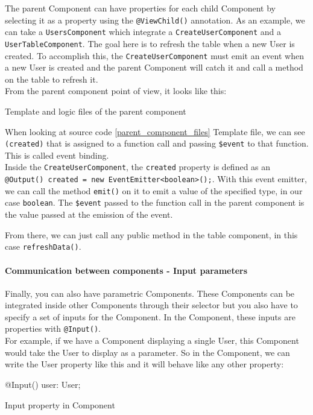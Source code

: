 \documentclass[twoside, openright,11pt,a4paper]{book}
\newenvironment{code}{\captionsetup{type=listing}}{}
\begin{document}
The parent Component can have properties for each child Component by selecting it as a property using the \verb+@ViewChild()+ annotation. As an example, we can take a \verb+UsersComponent+ which integrate a \verb+CreateUserComponent+ and a \verb+UserTableComponent+. The goal here is to refresh the table when a new User is created. To accomplish this, the \verb+CreateUserComponent+ must emit an event when a new User is created and the parent Component will catch it and call a method on the table to refresh it. \\

From the parent component point of view, it looks like this:
\begin{code}
	\caption{Template and logic files of the parent component}
	\label{parent_component_files}
\end{code}
When looking at source code \ref{parent_component_files} Template file, we can see \verb+(created)+ that is assigned to a function call and passing \verb+$event+ to that function. This is called event binding.\\

Inside the \verb+CreateUserComponent+, the \verb+created+ property is defined as an \texttt{@Output() created = new EventEmitter<boolean>();}. With this event emitter, we can call the method \verb+emit()+ on it to emit a value of the specified type, in our case \verb+boolean+. The \verb+$event+ passed to the function call in the parent component is the value passed at the emission of the event.

From there, we can just call any public method in the table component, in this case \verb+refreshData()+.

\paragraph{Communication between components - Input parameters}
\label{input_angular}
Finally, you can also have parametric Components. These Components can be integrated inside other Components through their selector but you also have to specify a set of inputs for the Component. In the Component, these inputs are properties with \verb+@Input()+. \\

For example, if we have a Component displaying a single User, this Component would take the User to display as a parameter. So in the Component, we can write the User property like this and it will behave like any other property:
\begin{code}
	\begin{inlinets}
@Input() user: User;
	\end{inlinets}
	\caption{Input property in Component}
\end{code}
\end{document}
